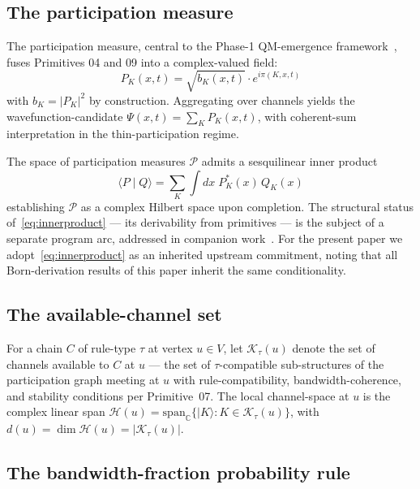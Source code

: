 \documentclass[11pt,a4paper]{article}
\begin{document}
\subsection{The participation measure}

The participation measure, central to the Phase-1 QM-emergence framework~\cite{phase1}, fuses Primitives 04 and 09 into a complex-valued field:
\begin{equation}
P_K(x, t) = \sqrt{b_K(x, t)} \cdot e^{i \pi(K, x, t)}
\label{eq:pmeasure}
\end{equation}
with $b_K = |P_K|^2$ by construction. Aggregating over channels yields the wavefunction-candidate $\Psi(x, t) = \sum_K P_K(x, t)$, with coherent-sum interpretation in the thin-participation regime.

The space of participation measures $\mathcal{P}$ admits a sesquilinear inner product
\begin{equation}
\langle P \mid Q \rangle = \sum_K \int dx\; P_K^*(x)\, Q_K(x)
\label{eq:innerproduct}
\end{equation}
establishing $\mathcal{P}$ as a complex Hilbert space upon completion. The structural status of~\eqref{eq:innerproduct} --- its derivability from primitives --- is the subject of a separate program arc, addressed in companion work~\cite{u2discrete,u2continuum}. For the present paper we adopt~\eqref{eq:innerproduct} as an inherited upstream commitment, noting that all Born-derivation results of this paper inherit the same conditionality.

\subsection{The available-channel set}

For a chain $C$ of rule-type $\tau$ at vertex $u \in V$, let $\mathcal{K}_\tau(u)$ denote the set of channels available to $C$ at $u$ --- the set of $\tau$-compatible sub-structures of the participation graph meeting at $u$ with rule-compatibility, bandwidth-coherence, and stability conditions per Primitive~07. The local channel-space at $u$ is the complex linear span $\mathcal{H}(u) = \mathrm{span}_\mathbb{C}\{|K\rangle : K \in \mathcal{K}_\tau(u)\}$, with $d(u) = \dim \mathcal{H}(u) = |\mathcal{K}_\tau(u)|$.

\subsection{The bandwidth-fraction probability rule}
\end{document}

